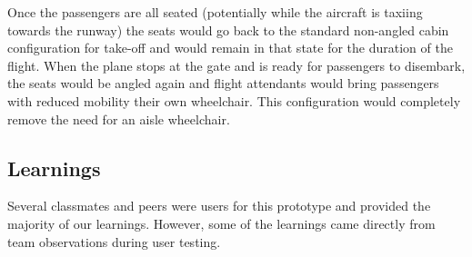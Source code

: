 Once the passengers are all seated (potentially while the aircraft is taxiing towards the runway) the seats would go back to the standard non-angled cabin configuration for take-off and would remain in that state for the duration of the flight. When the plane stops at the gate and is ready for passengers to disembark, the seats would be angled again and flight attendants would bring passengers with reduced mobility their own wheelchair. This configuration would completely remove the need for an aisle wheelchair.\\ 






\subsection{Learnings}
Several classmates and peers were users for this prototype and provided the majority of our learnings.  However, some of the learnings came directly from team observations during user testing. 
\\


